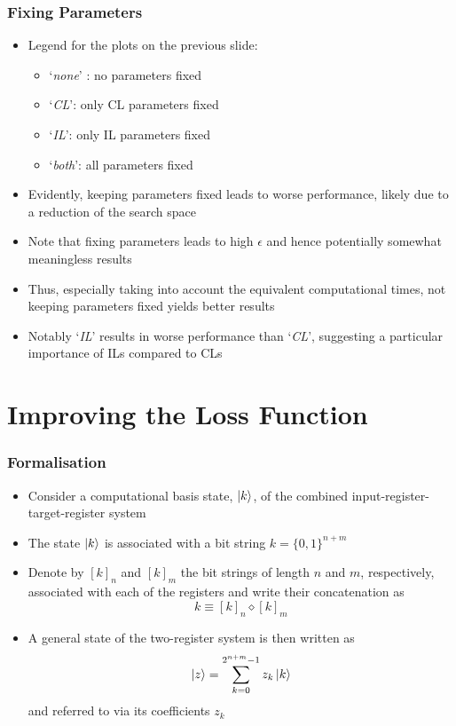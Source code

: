 \documentclass{beamer}
\begin{document}
\begin{frame}
\frametitle{Fixing Parameters}
\begin{itemize}
\item Legend for the plots on the previous slide:
\begin{itemize}
\item `\emph{none}' : no parameters fixed 
\item `\emph{CL}': only CL parameters fixed
\item `\emph{IL}': only IL parameters fixed 
\item `\emph{both}': all parameters fixed  
\end{itemize} 
\item Evidently, keeping parameters fixed leads to  \alert{worse performance}, likely due to a reduction of the search space  
\item Note that fixing parameters leads to high $\epsilon$ and hence potentially somewhat meaningless results 
\item Thus, especially taking into account the equivalent computational times, \alert{not keeping parameters fixed yields better results} 
\item Notably `\emph{IL}' results in worse performance than `\emph{CL}',  suggesting a particular importance of ILs compared to CLs 
\end{itemize}
\end{frame}

\section{Improving the Loss Function}

\begin{frame}
\frametitle{Formalisation}
\begin{itemize}
\item Consider a computational basis state, $\ket{k}$, of the \alert{combined} input-register-target-register \alert{system} 
\item The state $\ket{k}$ is associated with a \alert{bit string} $k = \{0,1 \}^{n+m}$
\item Denote by $[k]_n$ and $[k]_m$ the bit strings of length $n$ and $m$, respectively, associated with each of the registers and write their \alert{concatenation} as 
\begin{equation}
k \equiv [k]_n \diamond [k]_m
\end{equation} 
\item A general state of the two-register system is then written as 
\begin{equation}
\ket{z} = \sum^{2^{n+m}-1}_{k=0} z_k \ket{k}
\end{equation}
and referred to via its \alert{coefficients} $z_k$
\end{itemize}
\end{frame}
\end{document}
